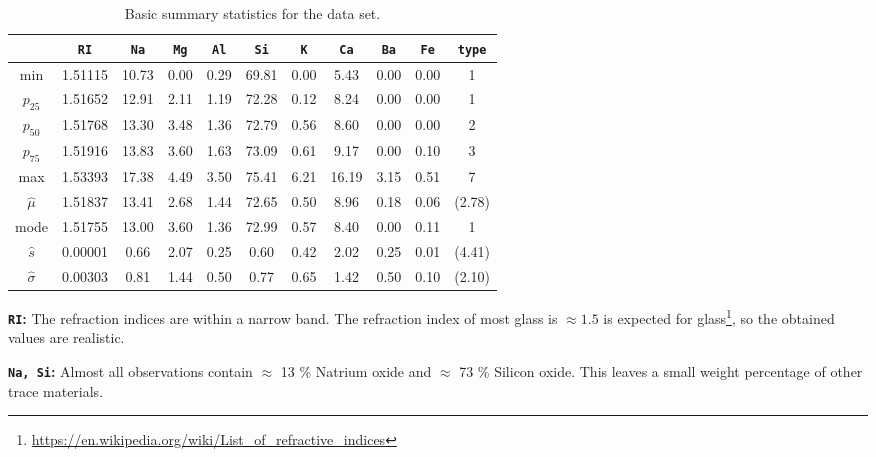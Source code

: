 \begin{table}[H]
    \centering
    \begin{tabular}{c|c|c|c|c|c|c|c|c|c|c}

~ & \texttt{RI} & \texttt{Na} & \texttt{Mg} & \texttt{Al} & \texttt{Si} & \texttt{K} & \texttt{Ca} & \texttt{Ba} & \texttt{Fe} & \texttt{type}\\ \hline \hline

min & 1.51115 & 10.73 & 0.00 & 0.29 & 69.81 & 0.00 & 5.43 & 0.00 & 0.00 & 1 \\

$p_{25}$ & 1.51652 & 12.91 & 2.11 & 1.19 & 72.28 & 0.12 & 8.24 & 0.00 & 0.00 & 1 \\

$p_{50}$ & 1.51768 & 13.30 & 3.48 & 1.36 & 72.79 & 0.56 & 8.60 & 0.00 & 0.00 & 2 \\ 

$p_{75}$ &1.51916 & 13.83 & 3.60 & 1.63 & 73.09 & 0.61 & 9.17 & 0.00 & 0.10 & 3 \\

max & 1.53393 & 17.38 & 4.49 & 3.50 & 75.41 & 6.21 & 16.19 & 3.15 & 0.51 & 7 \\ \hline

$\hat{\mu}$ & 1.51837 & 13.41 & 2.68 & 1.44 & 72.65 & 0.50 & 8.96 & 0.18 & 0.06 & (2.78) \\

mode & 1.51755 & 13.00 & 3.60 & 1.36 & 72.99 & 0.57 & 8.40 & 0.00 & 0.11 & 1 \\

$\hat{s}$ & 0.00001 & 0.66 & 2.07 & 0.25 & 0.60 & 0.42 & 2.02 & 0.25 & 0.01 & (4.41) \\

$\hat{\sigma}$ & 0.00303 & 0.81 & 1.44 & 0.50 & 0.77 & 0.65 & 1.42 & 0.50 & 0.10 & (2.10) \\ 

    \end{tabular}
    \caption{Basic summary statistics for the data set.}
    \label{tab:summary_statistics}
\end{table}

\textbf{\texttt{RI}:} The refraction indices are within a narrow band. The refraction index of most glass is $\approx 1.5$ is expected for glass\footnote{\url{https://en.wikipedia.org/wiki/List_of_refractive_indices}}, so the obtained values are realistic.

\textbf{\texttt{Na, Si}:} Almost all observations contain $\approx$ 13 \% Natrium oxide and $\approx $ 73 \% Silicon oxide. This leaves a small weight percentage of other trace materials. 

